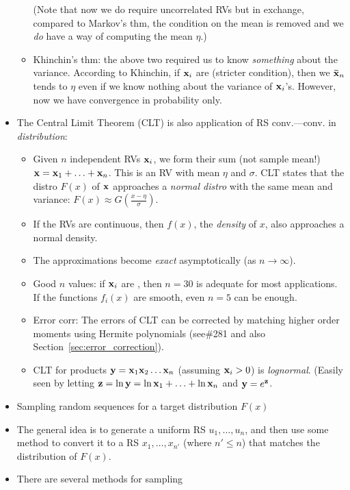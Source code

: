 \documentclass[a4paper, oneside]{book}
\begin{document}
\begin{itemize}
\begin{itemize}
	(Note that now we do require uncorrelated RVs but in exchange, compared to Markov's thm, the condition on the mean is removed and we \textit{do} have a way of computing the mean $\eta$.)
	\item Khinchin's thm: the above two required us to know \textit{something} about the variance. According to Khinchin, if $\mathbf{x}_i$ are \iid (stricter condition), then we $\mathbf{\bar{x}}_n$ tends to $\eta$ even if we know nothing about the variance of $\mathbf{x}_i$'s. However, now we have convergence in probability only.
	\end{itemize}
\item The Central Limit Theorem (CLT) is also application of RS conv.\----conv. in \textit{distribution}:
	\begin{itemize}
	\item Given $n$ independent RVs $\mathbf{x}_i$, we form their sum (not sample mean!) $\mathbf{x}=\mathbf{x}_1+ \hdots+ \mathbf{x}_n$. This is an RV with mean $\eta$ and $\sigma$. CLT states that the distro $F(x)$ of $\mathbf{x}$ approaches a \textit{normal distro} with the same mean and variance: $F(x)\approx G(\frac{x-\eta}{\sigma})$.
	\item If the RVs are continuous, then $f(x)$, the \textit{density} of $x$, also approaches a normal density.
	\item The approximations become \textit{exact} asymptotically (\ie as $n\to \infty$).  
	\item Good $n$ values: if $\mathbf{x}_i$ are \iid, then $n=30$ is adequate for most applications. If the functions $f_{i}(x)$ are smooth, even $n=5$ can be enough.
	\item Error corr: The errors of CLT can be corrected by matching higher order moments using Hermite polynomials (see\#281 and also Section~\ref{sec:error_correction}).
	\item CLT for products $\mathbf{y}=\mathbf{x}_1\mathbf{x}_2\hdots\mathbf{x}_n$ (assuming $\mathbf{x}_i>0$) is \textit{lognormal}. (Easily seen by letting $\mathbf{z} = \ln{\mathbf{y}} = \ln \mathbf{x}_1+\hdots+\ln\mathbf{x}_n$ and $\mathbf{y} = e^{\mathbf{z}}$.
	\end{itemize}
\item Sampling random sequences for a target distribution $F(x)$
\item The general idea is to generate a uniform RS $u_1, \hdots, u_n$, and then use some method to convert it to a RS $x_1, \hdots, x_{n'}$ (where $n' \leq n$) that matches the distribution of $F(x)$.
\item There are several methods for sampling
	\begin{itemize}

\end{itemize}
\end{itemize}
\end{document}
